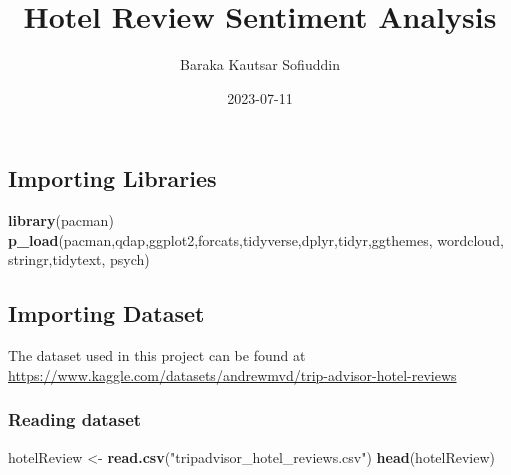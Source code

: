 \documentclass[
]{article}
\title{Hotel Review Sentiment Analysis}
\author{Baraka Kautsar Sofiuddin}
\date{2023-07-11}
\newenvironment{Shaded}{\begin{snugshade}}{\end{snugshade}}
\newcommand{\FunctionTok}[1]{\textcolor[rgb]{0.13,0.29,0.53}{\textbf{#1}}}
\newcommand{\NormalTok}[1]{#1}
\newcommand{\OtherTok}[1]{\textcolor[rgb]{0.56,0.35,0.01}{#1}}
\newcommand{\StringTok}[1]{\textcolor[rgb]{0.31,0.60,0.02}{#1}}
\begin{document}
\maketitle

\hypertarget{importing-libraries}{%
\subsection{Importing Libraries}\label{importing-libraries}}

\begin{Shaded}
\begin{Highlighting}[]
\FunctionTok{library}\NormalTok{(pacman)}
\FunctionTok{p\_load}\NormalTok{(pacman,qdap,ggplot2,forcats,tidyverse,dplyr,tidyr,ggthemes, wordcloud, stringr,tidytext, psych)}
\end{Highlighting}
\end{Shaded}

\hypertarget{importing-dataset}{%
\subsection{Importing Dataset}\label{importing-dataset}}

The dataset used in this project can be found at
\url{https://www.kaggle.com/datasets/andrewmvd/trip-advisor-hotel-reviews}

\hypertarget{reading-dataset}{%
\subsubsection{Reading dataset}\label{reading-dataset}}

\begin{Shaded}
\begin{Highlighting}[]
\NormalTok{hotelReview }\OtherTok{\textless{}{-}} \FunctionTok{read.csv}\NormalTok{(}\StringTok{"tripadvisor\_hotel\_reviews.csv"}\NormalTok{)}
\FunctionTok{head}\NormalTok{(hotelReview)}
\end{Highlighting}
\end{Shaded}
\end{document}
